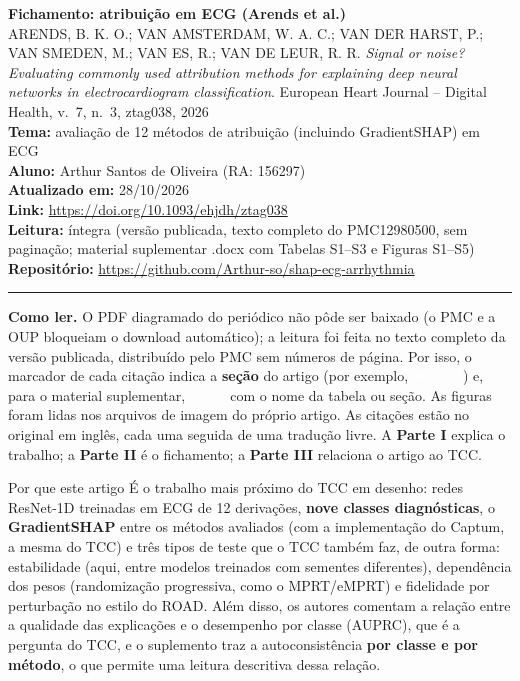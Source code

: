 \documentclass[11pt,a4paper]{article}
\newcommand{\pagechip}[1]{{\setlength{\fboxsep}{1.5pt}\colorbox{cAcc}{\textcolor{white}{\scriptsize\texttt{#1}}}}}
\begin{document}
\begin{center}
    {\LARGE \textbf{Fichamento: atribuição em ECG (Arends et al.)}} \\[0.35em]
    {\large ARENDS, B. K. O.; VAN AMSTERDAM, W. A. C.; VAN DER HARST, P.; VAN SMEDEN, M.; VAN ES, R.; VAN DE LEUR, R. R. \textit{Signal or noise? Evaluating commonly used attribution methods for explaining deep neural networks in electrocardiogram classification}. European Heart Journal -- Digital Health, v.~7, n.~3, ztag038, 2026} \\[0.3em]
    \textbf{Tema:} avaliação de 12 métodos de atribuição (incluindo GradientSHAP) em ECG \\[0.2em]
    \textbf{Aluno:} Arthur Santos de Oliveira (RA: 156297) \\[0.2em]
    \textbf{Atualizado em:} 28/10/2026 \\[0.2em]
    \textbf{Link:} \url{https://doi.org/10.1093/ehjdh/ztag038} \\[0.2em]
    \textbf{Leitura:} íntegra (versão publicada, texto completo do PMC12980500, sem paginação; material suplementar .docx com Tabelas S1--S3 e Figuras S1--S5) \\[0.2em]
    \textbf{Repositório:} \url{https://github.com/Arthur-so/shap-ecg-arrhythmia}
\end{center}
\vspace{-0.5em}
\hrule
\vspace{0.8em}

\textbf{Como ler.} O PDF diagramado do periódico não pôde ser baixado (o PMC e a OUP bloqueiam o download automático); a leitura foi feita no texto completo da versão publicada, distribuído pelo PMC sem números de página. Por isso, o marcador de cada citação indica a \textbf{seção} do artigo (por exemplo, \pagechip{Métodos}) e, para o material suplementar, \pagechip{Supl.} com o nome da tabela ou seção. As figuras foram lidas nos arquivos de imagem do próprio artigo. As citações estão no original em inglês, cada uma seguida de uma tradução livre. A \textbf{Parte I} explica o trabalho; a \textbf{Parte II} é o fichamento; a \textbf{Parte III} relaciona o artigo ao TCC.

\begin{infobox}[note]{Por que este artigo}
É o trabalho mais próximo do TCC em desenho: redes ResNet-1D treinadas em ECG de 12 derivações, \textbf{nove classes diagnósticas}, o \textbf{GradientSHAP} entre os métodos avaliados (com a implementação do Captum, a mesma do TCC) e três tipos de teste que o TCC também faz, de outra forma: estabilidade (aqui, entre modelos treinados com sementes diferentes), dependência dos pesos (randomização progressiva, como o MPRT/eMPRT) e fidelidade por perturbação no estilo do ROAD. Além disso, os autores comentam a relação entre a qualidade das explicações e o desempenho por classe (AUPRC), que é a pergunta do TCC, e o suplemento traz a autoconsistência \textbf{por classe e por método}, o que permite uma leitura descritiva dessa relação.
\end{infobox}
\end{document}
